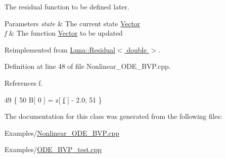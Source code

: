 The residual function to be defined later. 


\begin{DoxyParams}{Parameters}
{\em state} & The current state \hyperlink{classLuna_1_1Vector}{Vector} \\
\hline
{\em f} & The function \hyperlink{classLuna_1_1Vector}{Vector} to be updated \\
\hline
\end{DoxyParams}


Reimplemented from \hyperlink{classLuna_1_1Residual_ae1b1ebe3314c788b176bcac7b328de5c}{Luna\+::\+Residual$<$ double $>$}.



Definition at line 48 of file Nonlinear\+\_\+\+O\+D\+E\+\_\+\+B\+V\+P.\+cpp.



References f.


\begin{DoxyCode}
49         \{
50             B[ 0 ] = z[ \hyperlink{Nonlinear__ODE__BVP_8cpp_a06fc87d81c62e9abb8790b6e5713c55ba7ce756344023b99e5ab27b804feb765c}{f} ] - 2.0;
51         \}
\end{DoxyCode}


The documentation for this class was generated from the following files\+:\begin{DoxyCompactItemize}
\item 
Examples/\hyperlink{Nonlinear__ODE__BVP_8cpp}{Nonlinear\+\_\+\+O\+D\+E\+\_\+\+B\+V\+P.\+cpp}\item 
Examples/\hyperlink{ODE__BVP__test_8cpp}{O\+D\+E\+\_\+\+B\+V\+P\+\_\+test.\+cpp}\end{DoxyCompactItemize}
